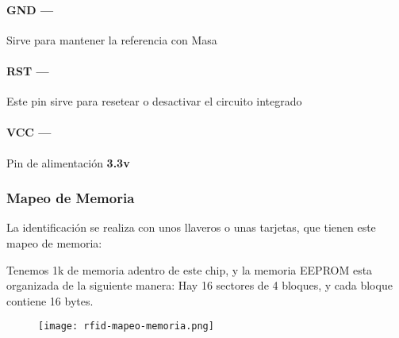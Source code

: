 \documentclass[../informe_krapp.tex]{subfiles}
\begin{document}
\paragraph{GND ---}
Sirve para mantener la referencia con Masa

\paragraph{RST ---}
Este pin sirve para resetear o desactivar el circuito integrado

\paragraph{VCC ---}
Pin de alimentación \textbf{3.3v}

\clearpage
\subsubsection{Mapeo de Memoria}
La identificación se realiza con unos llaveros o unas tarjetas,
que tienen este mapeo de memoria:

Tenemos 1k de memoria adentro de este chip, y la memoria EEPROM esta organizada de la
siguiente manera: Hay 16 sectores de 4 bloques, y cada bloque contiene 16 bytes.

\begin{figure}[H]
	\centering
	\texttt{[image: rfid-mapeo-memoria.png]}
\end{figure}
\end{document}
